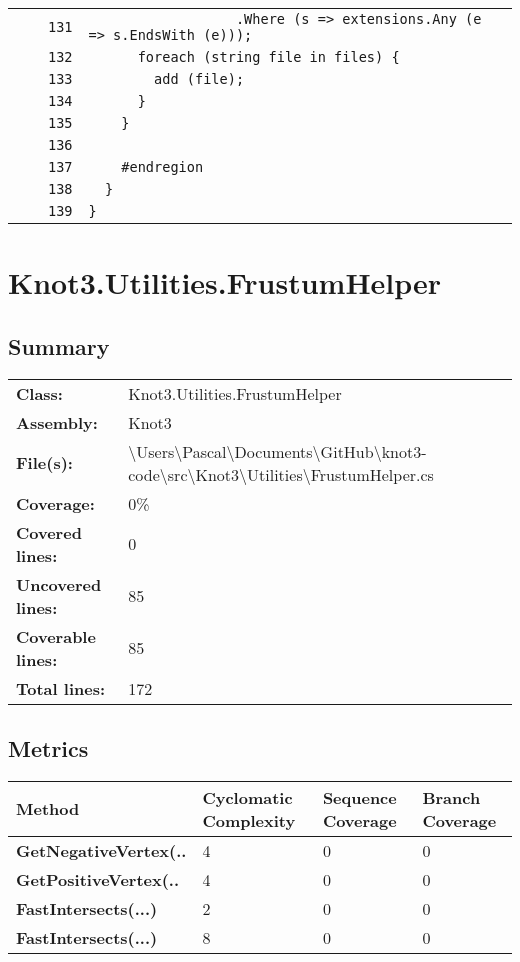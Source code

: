 \documentclass[a4paper,10pt]{article}
\begin{document}
\begin{longtable}[l]{lrrl}
\cellcolor{gray} &  & \verb~131~ & \verb~                  .Where (s => extensions.Any (e => s.EndsWith (e)));~\\
\cellcolor{gray} &  & \verb~132~ & \verb~      foreach (string file in files) {~\\
\cellcolor{gray} &  & \verb~133~ & \verb~        add (file);~\\
\cellcolor{gray} &  & \verb~134~ & \verb~      }~\\
\cellcolor{gray} &  & \verb~135~ & \verb~    }~\\
\cellcolor{gray} &  & \verb~136~ & \verb~~\\
\cellcolor{gray} &  & \verb~137~ & \verb~    #endregion~\\
\cellcolor{gray} &  & \verb~138~ & \verb~  }~\\
\cellcolor{gray} &  & \verb~139~ & \verb~}~\\
\end{longtable}
\newpage
\section{Knot3.Utilities.FrustumHelper}
\subsection{Summary}
\begin{longtable}[l]{ll}
\textbf{Class:} & Knot3.Utilities.FrustumHelper\\
\textbf{Assembly:} & Knot3\\
\textbf{File(s):} & \begin{minipage}[t]{12cm}{\textbackslash Users\textbackslash Pascal\textbackslash Documents\textbackslash GitHub\textbackslash knot3-code\textbackslash src\textbackslash Knot3\textbackslash Utilities\textbackslash FrustumHelper.cs}\end{minipage} \\
\textbf{Coverage:} & 0\%\\
\textbf{Covered lines:} & 0\\
\textbf{Uncovered lines:} & 85\\
\textbf{Coverable lines:} & 85\\
\textbf{Total lines:} & 172\\
\end{longtable}
\subsection{Metrics}
\begin{longtable}[l]{|l|l|l|l|}
\hline
\textbf{Method} & \textbf{Cyclomatic Complexity} & \textbf{Sequence Coverage} & \textbf{Branch Coverage}\\
\hline
\textbf{GetNegativeVertex(..} & 4 & 0 & 0\\
\hline
\textbf{GetPositiveVertex(..} & 4 & 0 & 0\\
\hline
\textbf{FastIntersects(...)} & 2 & 0 & 0\\
\hline
\textbf{FastIntersects(...)} & 8 & 0 & 0\\
\hline
\end{longtable}
\end{document}
